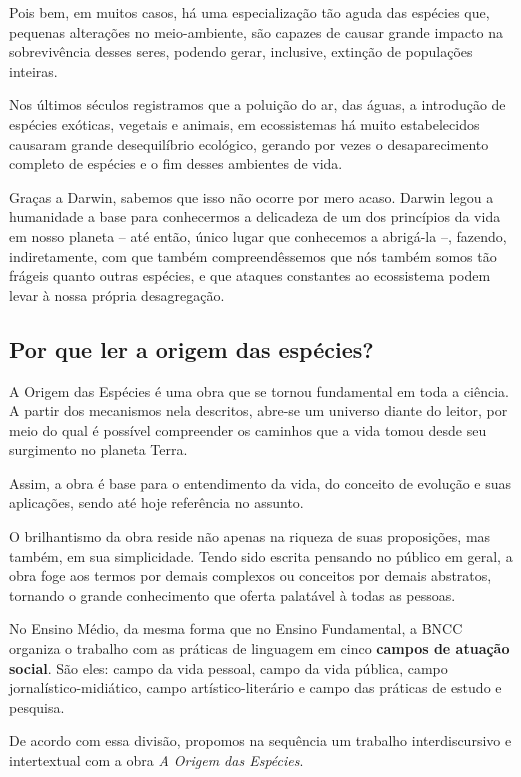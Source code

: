 \documentclass[11pt]{extarticle}
\begin{document}
Pois bem, em muitos casos, há uma especialização tão aguda das espécies que,
pequenas alterações no meio-ambiente, são capazes de causar grande impacto na
sobrevivência desses seres, podendo gerar, inclusive, extinção de populações
inteiras.

Nos últimos séculos registramos que a poluição do ar, das águas, a introdução
de espécies exóticas, vegetais e animais, em ecossistemas há muito
estabelecidos causaram grande desequilíbrio ecológico, gerando por vezes
o desaparecimento completo de espécies e o fim desses ambientes de vida.

Graças a Darwin, sabemos que isso não ocorre por mero acaso. Darwin legou
a humanidade a base para conhecermos a delicadeza de um dos princípios da vida
em nosso planeta -- até então, único lugar que conhecemos a abrigá-la --,
fazendo, indiretamente, com que também compreendêssemos que nós também somos
tão frágeis quanto outras espécies, e que ataques constantes ao ecossistema
podem levar à nossa própria desagregação.

\subsection{Por que ler a origem das espécies?}

A Origem das Espécies é uma obra que se tornou fundamental em toda
a ciência. A partir dos mecanismos nela descritos, abre-se um universo diante
do leitor, por meio do qual é possível compreender os caminhos que a vida tomou
desde seu surgimento no planeta Terra.

Assim, a obra é base para o entendimento da vida, do conceito de evolução e suas
aplicações, sendo até hoje referência no assunto.

O brilhantismo da obra reside não apenas na riqueza de suas proposições, mas
também, em sua simplicidade. Tendo sido escrita pensando no público em geral,
a obra foge aos termos por demais complexos ou conceitos por demais abstratos,
tornando o grande conhecimento que oferta palatável à todas as pessoas.



No Ensino Médio, da mesma forma que no Ensino Fundamental, a BNCC organiza
o trabalho com as práticas de linguagem em cinco \textbf{campos de atuação
social}. São eles: campo da vida pessoal, campo da vida pública, campo
jornalístico-midiático, campo artístico-literário e campo das práticas de
estudo e pesquisa.

De acordo com essa divisão, propomos na sequência um trabalho interdiscursivo
e intertextual com a obra \emph{A Origem das Espécies}.
\end{document}
